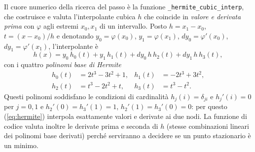 Il cuore numerico della ricerca del passo è la funzione
\texttt{\_hermite\_cubic\_interp}, che costruisce e valuta l'interpolante
cubica $h$ che coincide in \emph{valore e derivata prima} con $\varphi$ agli
estremi $x_0, x_1$ di un intervallo. Posto
$h = x_1 - x_0$, $t = (x - x_0)/h$ e denotando
$y_0 = \varphi(x_0)$, $y_1 = \varphi(x_1)$,
$dy_0 = \varphi'(x_0)$, $dy_1 = \varphi'(x_1)$, l'interpolante è
\begin{equation}
\label{eq:hermite}
h(x) = y_0\,h_0(t) + y_1\,h_1(t) + dy_0\,h\,h_2(t) + dy_1\,h\,h_3(t),
\end{equation}
con i quattro \emph{polinomi base di Hermite}
\begin{equation}
\label{eq:hermite-basis}
\begin{aligned}
h_0(t) &= 2t^3 - 3t^2 + 1, & h_1(t) &= -2t^3 + 3t^2,\\
h_2(t) &= t^3 - 2t^2 + t,  & h_3(t) &= t^3 - t^2.
\end{aligned}
\end{equation}
Questi polinomi soddisfano le condizioni di cardinalità
$h_j(i) = \delta_{ji}$ e $h_j'(i) = 0$ per $j = 0,1$ e
$h_2'(0) = h_3'(1) = 1$, $h_2'(1) = h_3'(0) = 0$: per questo
(\ref{eq:hermite}) interpola esattamente valori e derivate ai due nodi.
La funzione di codice valuta inoltre le derivate prima e seconda di $h$
(stesse combinazioni lineari dei polinomi base derivati) perché
serviranno a decidere se un punto stazionario è un minimo.

